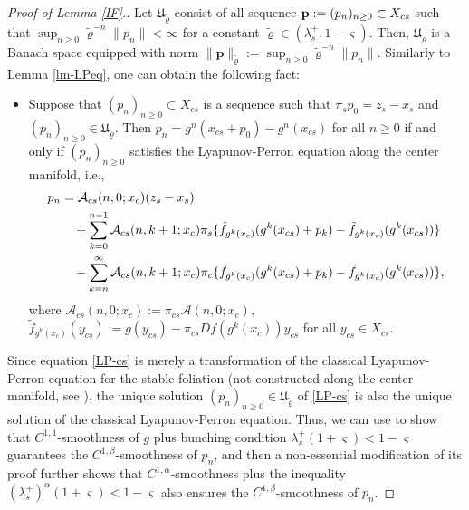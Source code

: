 \documentclass[reqno]{amsart}
\numberwithin{equation}{section}
\begin{document}
\begin{proof}[Proof of Lemma {\rm \ref{IF}.}]
Let $\mathfrak{U}_{\tilde{\varrho}}$ consist of all sequence ${\bf p}:=(p_n)_{n\ge 0}\subset X_{cs}$ such that $\sup_{n\ge 0}\tilde{\varrho}^{-n}\|p_n\|<\infty$
for a constant $\tilde{\varrho}\in(\lambda_s^+,1-\varsigma)$.
Then, $\mathfrak{U}_{\tilde{\varrho}}$ is a Banach space equipped with norm
$\|\mathbf{p}\|_{\tilde{\varrho}}:=\sup_{n\ge 0}\tilde{\varrho}^{-n} \|p_n\|$.
Similarly to Lemma \ref{lm-LPeq}, one can obtain the following fact:
\begin{itemize}
\item Suppose that $(p_n)_{n\ge 0}\subset X_{cs}$ is a sequence such that $\pi_s p_0=z_s-x_s$ and $(p_n)_{n\ge 0}\in \mathfrak{U}_{\tilde{\varrho}}$.
Then
$p_n=g^n(x_{cs}+p_0)-g^n(x_{cs})$ for all $n\ge 0$ if and only if $(p_n)_{n\ge 0}$ satisfies the Lyapunov-Perron equation along the center manifold, i.e.,
\begin{align}\label{LP-cs}
p_n &=\mathcal{A}_{cs}(n,0;x_c)(z_s-x_s)
\notag \\
&\quad +\sum_{k=0}^{n-1} \mathcal{A}_{cs}(n,k+1;x_c)
\pi_s \{ \tilde f_{g^k(x_{c})}(g^k(x_{cs})+p_k)- \tilde f_{g^k(x_{c})}(g^k(x_{cs})) \}
\notag \\
&\quad - \sum_{k=n}^\infty \mathcal{A}_{cs}(n,k+1;x_c)
 \pi_c \{  \tilde f_{g^k(x_{c})}(g^k(x_{cs})+p_k)- \tilde f_{g^k(x_{c})}(g^k(x_{cs}))\},  
\end{align}
 where $\mathcal{A}_{cs}(n,0;x_c):=\pi_{cs} \mathcal{A}(n,0;x_c)$,
$ \tilde f_{g^k(x_{c})}(y_{cs}):=g(y_{cs})-\pi_{cs} Df(g^k(x_{c}))y_{cs}$ for all $y_{cs}\in X_{cs}$.
\end{itemize}
Since equation \eqref{LP-cs} is merely a transformation of the classical Lyapunov-Perron equation  for the stable foliation (not constructed along the center manifold, see \cite[(3.2)]{ZZJ-MA}), the unique solution $(p_n)_{n\ge 0}\in \mathfrak{U}_{\tilde{\varrho}}$ of \eqref{LP-cs} is also the unique solution of the classical Lyapunov-Perron equation. Thus, we can use \cite[Lemmas 2-3]{ZZJ-MA} to show that $C^{1,1}$-smoothness of $g$ plus bunching condition $\lambda_s^+(1+\varsigma)<1-\varsigma$ guarantees the
$C^{1,\beta}$-smoothness of $p_n$,
and then a non-essential modification of its proof further shows that $C^{1,\alpha}$-smoothness plus the inequality
 $(\lambda_s^+)^\alpha(1+\varsigma)<1-\varsigma$ also ensures the
$C^{1,\beta}$-smoothness of $p_n$.



\end{proof}
\end{document}

